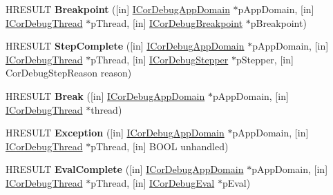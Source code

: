 \begin{DoxyCompactItemize}
\item 
\mbox{\label{interface_i_cor_debug_managed_callback_a66838d4370d38601a811899780c2aa36}} 
H\+R\+E\+S\+U\+LT {\bfseries Breakpoint} (\mbox{[}in\mbox{]} \hyperlink{interface_i_cor_debug_app_domain}{I\+Cor\+Debug\+App\+Domain} $\ast$p\+App\+Domain, \mbox{[}in\mbox{]} \hyperlink{interface_i_cor_debug_thread}{I\+Cor\+Debug\+Thread} $\ast$p\+Thread, \mbox{[}in\mbox{]} \hyperlink{interface_i_cor_debug_breakpoint}{I\+Cor\+Debug\+Breakpoint} $\ast$p\+Breakpoint)
\item 
\mbox{\label{interface_i_cor_debug_managed_callback_aca136a0ce1bbd372c0cefac8fe08076c}} 
H\+R\+E\+S\+U\+LT {\bfseries Step\+Complete} (\mbox{[}in\mbox{]} \hyperlink{interface_i_cor_debug_app_domain}{I\+Cor\+Debug\+App\+Domain} $\ast$p\+App\+Domain, \mbox{[}in\mbox{]} \hyperlink{interface_i_cor_debug_thread}{I\+Cor\+Debug\+Thread} $\ast$p\+Thread, \mbox{[}in\mbox{]} \hyperlink{interface_i_cor_debug_stepper}{I\+Cor\+Debug\+Stepper} $\ast$p\+Stepper, \mbox{[}in\mbox{]} Cor\+Debug\+Step\+Reason reason)
\item 
\mbox{\label{interface_i_cor_debug_managed_callback_aa8e9318b7ad0082480e2a9a1fdbda490}} 
H\+R\+E\+S\+U\+LT {\bfseries Break} (\mbox{[}in\mbox{]} \hyperlink{interface_i_cor_debug_app_domain}{I\+Cor\+Debug\+App\+Domain} $\ast$p\+App\+Domain, \mbox{[}in\mbox{]} \hyperlink{interface_i_cor_debug_thread}{I\+Cor\+Debug\+Thread} $\ast$thread)
\item 
\mbox{\label{interface_i_cor_debug_managed_callback_aaedd559fe60bff3b1c6e7367edb0041b}} 
H\+R\+E\+S\+U\+LT {\bfseries Exception} (\mbox{[}in\mbox{]} \hyperlink{interface_i_cor_debug_app_domain}{I\+Cor\+Debug\+App\+Domain} $\ast$p\+App\+Domain, \mbox{[}in\mbox{]} \hyperlink{interface_i_cor_debug_thread}{I\+Cor\+Debug\+Thread} $\ast$p\+Thread, \mbox{[}in\mbox{]} B\+O\+OL unhandled)
\item 
\mbox{\label{interface_i_cor_debug_managed_callback_a7806bf3e3e9a586ded924d7e1831753b}} 
H\+R\+E\+S\+U\+LT {\bfseries Eval\+Complete} (\mbox{[}in\mbox{]} \hyperlink{interface_i_cor_debug_app_domain}{I\+Cor\+Debug\+App\+Domain} $\ast$p\+App\+Domain, \mbox{[}in\mbox{]} \hyperlink{interface_i_cor_debug_thread}{I\+Cor\+Debug\+Thread} $\ast$p\+Thread, \mbox{[}in\mbox{]} \hyperlink{interface_i_cor_debug_eval}{I\+Cor\+Debug\+Eval} $\ast$p\+Eval)

\end{DoxyCompactItemize}
